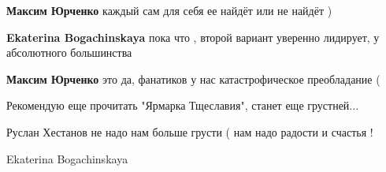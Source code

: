 \begin{itemize}
\begin{itemize}
 
\textbf{Максим Юрченко} каждый сам для себя ее найдёт или не найдёт )

 
\textbf{Ekaterina Bogachinskaya} пока что , второй вариант уверенно лидирует, у абсолютного большинства\Laughey[1.0][white]

 
\textbf{Максим Юрченко} это да, фанатиков у нас катастрофическое преобладание (
\end{itemize}

 
Рекомендую еще прочитать "Ярмарка Тщеславия", станет еще грустней... 🙁

 
Руслан Хестанов не надо нам больше грусти ( нам надо радости и счастья !

 
Ekaterina Bogachinskaya \Smiley[1.0][yellow]

\end{itemize}

